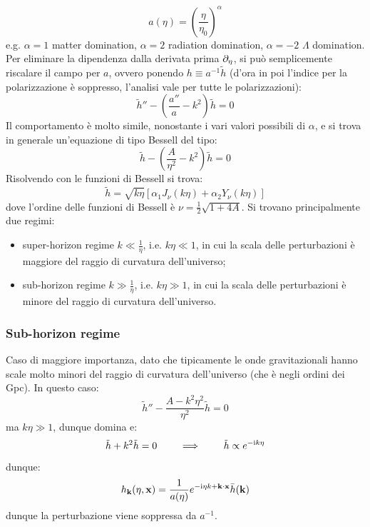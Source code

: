 \begin{equation*}
  a(\eta) = \left( \frac{\eta}{\eta_0} \right)^\alpha
\end{equation*}
e.g. $ \alpha = 1 $ matter domination, $ \alpha = 2 $ radiation domination, $ \alpha = -2 $ $ \Lambda $ domination. Per eliminare la dipendenza dalla derivata prima $ \partial_\eta $, si può semplicemente riscalare il campo per $ a $, ovvero ponendo $ h \equiv a^{-1} \tilde{h} $ (d'ora in poi l'indice per la polarizzazione è soppresso, l'analisi vale per tutte le polarizzazioni):
\begin{equation}
  \tilde{h}'' - \left( \frac{a''}{a} - k^2 \right) \tilde{h} = 0
\end{equation}
Il comportamento è molto simile, nonostante i vari valori possibili di $ \alpha $, e si trova in generale un'equazione di tipo Bessell del tipo:
\begin{equation*}
  \tilde{h} - \left( \frac{A}{\eta^2} - k^2 \right) \tilde{h} = 0
\end{equation*}
Risolvendo con le funzioni di Bessell si trova:
\begin{equation}
  \tilde{h} = \sqrt{k \eta} \left[ \alpha_1 J_\nu(k \eta) + \alpha_2 Y_\nu (k \eta) \right]
\end{equation}
dove l'ordine delle funzioni di Bessell è $ \nu = \frac{1}{2} \sqrt{1 + 4 A} $. Si trovano principalmente due regimi:
\begin{itemize}
  \item super-horizon regime $ k \ll \frac{1}{\eta} $, i.e. $ k \eta \ll 1 $, in cui la scala delle perturbazioni è maggiore del raggio di curvatura dell'universo;
  \item sub-horizon regime $ k \gg \frac{1}{\eta} $, i.e. $ k \eta \gg 1 $, in cui la scala delle perturbazioni è minore del raggio di curvatura dell'universo.
\end{itemize}

\subsubsection{Sub-horizon regime}

Caso di maggiore importanza, dato che tipicamente le onde gravitazionali hanno scale molto minori del raggio di curvatura dell'universo (che è negli ordini dei Gpc). In questo caso:
\begin{equation*}
  \tilde{h}'' - \frac{A - k^2 \eta^2}{\eta^2} \tilde{h} = 0
\end{equation*}
ma $ k\eta \gg 1 $, dunque domina e:
\begin{equation*}
  \tilde{h} + k^2 \tilde{h} = 0
  \qquad \implies \qquad
  \tilde{h} \propto e^{- \mathrm{i} k \eta}
\end{equation*}
dunque:
\begin{equation}
  h_{\mathbf{k}}(\eta , \mathbf{x}) = \frac{1}{a(\eta)} e^{-\mathrm{i} \eta k + \mathbf{k} \cdot \mathbf{x}} \bar{h}(\mathbf{k})
\end{equation}
dunque la perturbazione viene soppressa da $ a^{-1} $.

